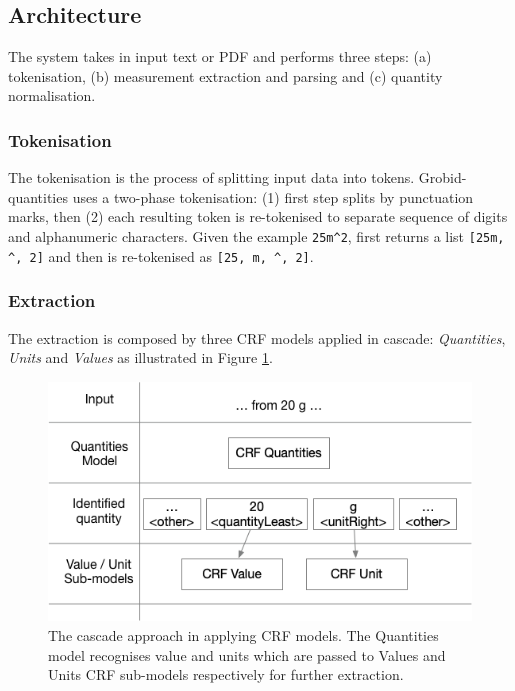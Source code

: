 \documentclass[sigconf]{acmart}
\begin{document}
\subsection{Architecture}
The system takes in input text or PDF and performs three steps: (a) tokenisation, (b) measurement extraction and parsing and (c) quantity normalisation. 

\subsubsection{Tokenisation}
The tokenisation is the process of splitting input data into tokens. Grobid-quantities uses a two-phase tokenisation: (1) first step splits by punctuation marks, then (2) each resulting token is re-tokenised to separate sequence of digits and alphanumeric characters. Given the example \texttt{25m\^{}2}, first returns a list \texttt{[25m, \^{}, 2]} and then is re-tokenised as \texttt{[25, m, \^{}, 2]}. 

\subsubsection{Extraction}
The extraction is composed by three CRF models applied in cascade: \textit{Quantities}, \textit{Units} and \textit{Values} as illustrated in Figure \ref{fig:schema-cascade}.  

\begin{figure}[ht]
  \centering
  \includegraphics[width=\linewidth]{images/schema-cascade}
  \caption{The cascade approach in applying CRF models. The Quantities model recognises value and units which are  passed to Values and Units CRF sub-models respectively for further extraction.}
  \label{fig:schema-cascade}
\end{figure}
\end{document}

